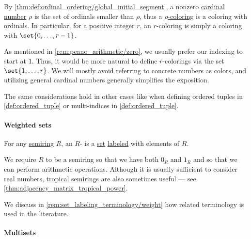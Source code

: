 \begin{remark}\label{rem:cardinal_colorings}
  By \cref{thm:def:ordinal_ordering/global_initial_segment}, a nonzero \hyperref[def:cardinal]{cardinal number} \( \rho \) is the set of ordinals smaller than \( \rho \), thus a \hyperref[def:set_coloring]{\( \rho \)-coloring} is a coloring with ordinals. In particular, for a positive integer \( r \), an \( r \)-coloring is simply a coloring with \( \set{ 0, \ldots, r - 1 } \).

  As mentioned in \cref{rem:peano_arithmetic/zero}, we usually prefer our indexing to start at \( 1 \). Thus, it would be more natural to define \( r \)-colorings via the set \( \set{ 1, \ldots, r } \). We will mostly avoid referring to concrete numbers as colors, and utilizing general cardinal numbers generally simplifies the exposition.

  The same considerations hold in other cases like when defining ordered tuples in \cref{def:ordered_tuple} or multi-indices in \cref{def:ordered_tuple}.
\end{remark}

\paragraph{Weighted sets}

\begin{definition}\label{def:weighted_set}\mimprovised
  For any \hyperref[def:semiring]{semiring} \( R \), an \( R \)- is a \hyperref[def:set]{set} \hyperref[def:labeled_set]{labeled} with elements of \( R \).
\end{definition}
\begin{comments}
  \item We require \( R \) to be a semiring so that we have both \( 0_R \) and \( 1_R \) and so that we can perform arithmetic operations. Although it is usually sufficient to consider real numbers, \hyperref[def:tropical_semiring]{tropical semirings} are also sometimes useful --- see \cref{thm:adjacency_matrix_tropical_power}.

  \item We discuss in \cref{rem:set_labeling_terminology/weight} how related terminology is used in the literature.
\end{comments}

\paragraph{Multisets}

